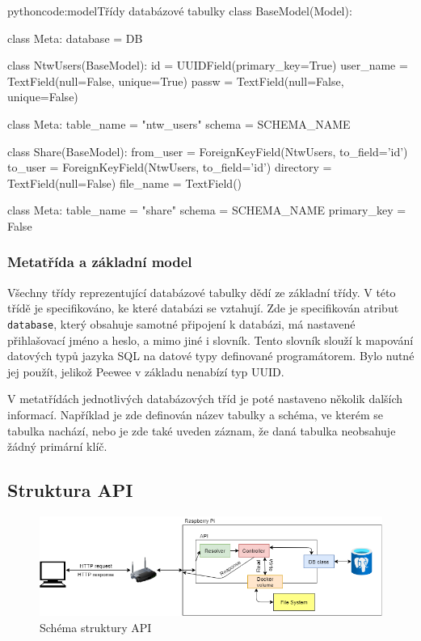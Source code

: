 \documentclass[
  glossaries,
]{kidiplom}
\begin{document}
\begin{kicode}{python}{code:model}{Třídy databázové tabulky}
class BaseModel(Model):

    class Meta:
        database = DB

class NtwUsers(BaseModel):
    id = UUIDField(primary_key=True)
    user_name = TextField(null=False, unique=True)
    passw = TextField(null=False, unique=False)

    class Meta:
        table_name = "ntw_users"
        schema = SCHEMA_NAME
        
class Share(BaseModel):
    from_user = ForeignKeyField(NtwUsers, to_field='id')
    to_user = ForeignKeyField(NtwUsers, to_field='id')
    directory = TextField(null=False)
    file_name = TextField()

    class Meta:
        table_name = "share"
        schema = SCHEMA_NAME
        primary_key = False
\end{kicode}

\subsubsection{Metatřída a základní model}
Všechny třídy reprezentující databázové tabulky dědí ze základní třídy. V této třídě je specifikováno, ke které databázi se vztahují. Zde je specifikován atribut \texttt{database}, který obsahuje samotné připojení k databázi, má nastavené přihlašovací jméno a heslo, a mimo jiné i slovník. Tento slovník slouží k mapování datových typů jazyka SQL na datové typy definované programátorem. Bylo nutné jej použít, jelikož Peewee v základu nenabízí typ UUID.

V metatřídách jednotlivých databázových tříd je poté nastaveno několik dalších informací. Například je zde definován název tabulky a schéma, ve kterém se tabulka nachází, nebo je zde také uveden záznam, že daná tabulka neobsahuje žádný primární klíč.

\clearpage

\subsection{Struktura API}
\begin{figure}[htp]
    \centering
    \includegraphics[width=15cm]{API_diagram}
    \caption{Schéma struktury API}
    \label{fig:APISchema}
\end{figure}
\end{document}
